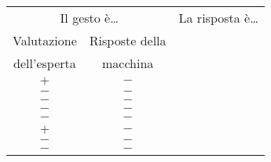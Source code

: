 \begin{table}
\centering
\begin{tabular}{c c|c}
\multicolumn{2}{c}{Il gesto è\dots} & {La risposta è\dots}\\
	Valutazione	&	Risposte della	& \\
    dell'esperta&	macchina		& \\
\hline
	$+$			&	$-$		& \Large{\frownie{}}\\
	$-$			&	$-$		& \Large{\smiley{}}\\
	$-$			&	$-$		& \Large{\smiley{}}\\
	$-$			&	$-$		& \Large{\smiley{}}\\
	$-$			&	$-$		& \Large{\smiley{}}\\
	$+$			&	$-$		& \Large{\frownie{}}\\
	$-$			&	$-$		& \Large{\smiley{}}\\
	$-$			&	$-$		& \Large{\smiley{}}
\end{tabular}
\end{table}
